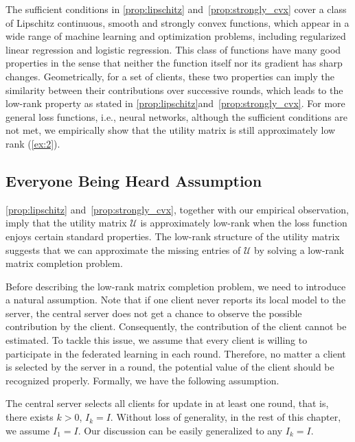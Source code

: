 The sufficient conditions in \autoref{prop:lipschitz} and~\autoref{prop:strongly_cvx} cover a class of Lipschitz continuous, smooth and strongly convex functions, which appear in a wide range of machine learning and optimization problems, including regularized linear regression and logistic regression. This class of functions have many good properties in the sense that neither the function itself nor its gradient has sharp changes. Geometrically, for a set of clients, these two properties can imply the similarity between their contributions over successive rounds, which leads to the low-rank property as stated in \autoref{prop:lipschitz}and~\autoref{prop:strongly_cvx}. For more general loss functions, i.e., neural networks, although the sufficient conditions are not met, we empirically show that the utility matrix is still approximately low rank (\autoref{ex:2}).

\subsection{Everyone Being Heard Assumption}

\autoref{prop:lipschitz} and~\autoref{prop:strongly_cvx}, together with our empirical observation, imply that the utility matrix $\mathcal{U}$ is approximately low-rank when the loss function enjoys certain standard properties. The low-rank structure of the utility matrix suggests that we can approximate the missing entries of $\mathcal{U}$ by solving a low-rank matrix completion problem.

Before describing the low-rank matrix completion problem, we need to introduce a natural assumption. Note that if one client never reports its local model to the server, 
the central server does not get a chance to observe the possible contribution by the client. Consequently, the contribution of the client cannot be estimated. To tackle this issue, we assume that every client is willing to participate in the federated learning in each round.  Therefore, no matter a client is selected by the server in a round, the potential value of the client should be recognized properly.  Formally, we have the following assumption.

\begin{assumption} \label{ass:main}
The central server selects all clients for update in at least one round, that is, there exists $k>0$, $I_k = I$.  Without loss of generality, in the rest of this chapter, we assume $I_1=I$. Our discussion can be easily generalized to any $I_k=I$.
\end{assumption}

